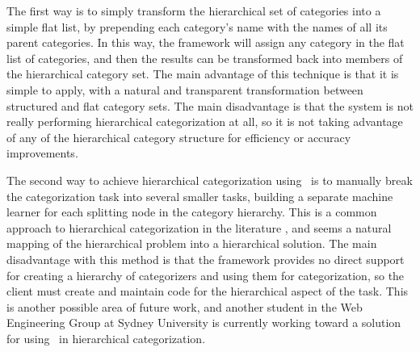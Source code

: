 The first way is to simply transform the hierarchical set of
categories into a simple flat list, by prepending each category's name
with the names of all its parent categories.  In this way, the
framework will assign any category in the flat list of categories, and
then the results can be transformed back into members of the
hierarchical category set.  The main advantage of this technique is
that it is simple to apply, with a natural and transparent
transformation between structured and flat category sets.  The main
disadvantage is that the system is not really performing hierarchical
categorization at all, so it is not taking advantage of any of the
hierarchical category structure for efficiency or accuracy
improvements.

The second way to achieve hierarchical categorization using \aicat\ is
to manually break the categorization task into several smaller tasks,
building a separate machine learner for each splitting node in the
category hierarchy.  This is a common approach to hierarchical
categorization in the literature
\cite{dumais:00,koller:97,chakrabarti:98}, and seems a natural mapping
of the hierarchical problem into a hierarchical solution.  The main
disadvantage with this method is that the framework provides no direct
support for creating a hierarchy of categorizers and using them for
categorization, so the client must create and maintain code for the
hierarchical aspect of the task.  This is another possible area of
future work, and another student in the Web Engineering Group at
Sydney University is currently working toward a solution for using
\aicat\ in hierarchical categorization.
